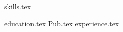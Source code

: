 \documentclass[11pt, a4paper]{awesome-cv}
\newcommand*{\sectiondir}{resume/}
\begin{document}
\makecvheader

{skills.tex}

{education.tex}
{Pub.tex}
\newpage
{experience.tex}



\end{document}
